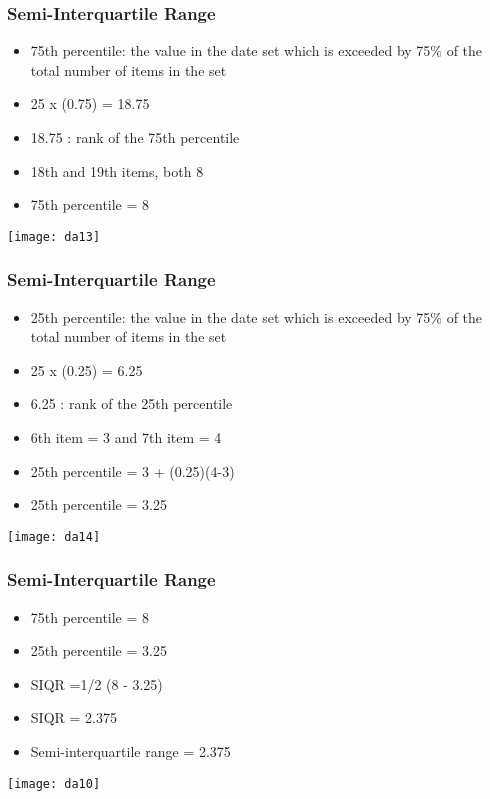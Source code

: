 \begin{frame}[fragile]\frametitle{Semi-Interquartile Range}	
\begin{itemize}
\item 75th percentile: the value in the date set which is exceeded by 75\% of the total number of items in the set
\item 25 x (0.75) = 18.75
\item 18.75 : rank of the 75th percentile
\item 18th  and 19th items, both  8
\item 75th percentile = 8
\end{itemize}
\begin{center}
\texttt{[image: da13]}
\end{center}
\end{frame}


\begin{frame}[fragile]\frametitle{Semi-Interquartile Range}	
\begin{itemize}
\item 25th percentile: the value in the date set which is exceeded by 75\% of the total number of items in the set
\item 25 x (0.25) = 6.25
\item 6.25 : rank of the 25th percentile
\item 6th item = 3 and 7th item = 4
\item 25th percentile = 3 + (0.25)(4-3)
\item 25th percentile = 3.25
\end{itemize}
\begin{center}
\texttt{[image: da14]}
\end{center}
\end{frame}


\begin{frame}[fragile]\frametitle{Semi-Interquartile Range}	
\begin{itemize}
\item 75th percentile = 8
\item 25th percentile = 3.25
\item SIQR =1/2 (8 - 3.25)
\item SIQR = 2.375
\item Semi-interquartile range = 2.375
\end{itemize}

\begin{center}
\texttt{[image: da10]}
\end{center}
\end{frame}



